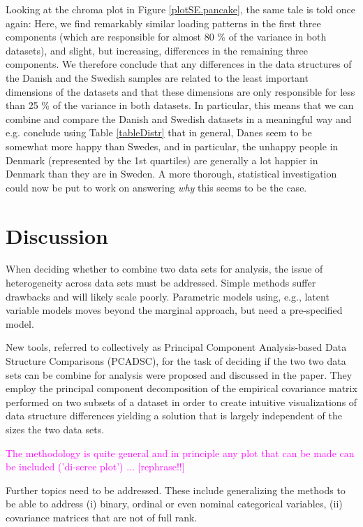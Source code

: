 \documentclass[titlepage,11pt,twoside]{article}
\newcommand{\hl}[1]{\textcolor{magenta}{#1}}
\begin{document}
Looking at the chroma plot in Figure \ref{plotSE.pancake}, the same tale is told once again: Here, we find remarkably similar loading patterns in the first three components (which are responsible for almost 80 \% of the variance in both datasets), and slight, but increasing, differences in the remaining three components. We therefore conclude that any differences in the data structures of the Danish and the Swedish samples are related to the least important dimensions of the datasets and that these dimensions are only responsible for less than 25 \% of the variance in both datasets. In particular, this means that we can combine and compare the Danish and Swedish datasets in a meaningful way and e.g. conclude using Table \ref{tableDistr} that in general, Danes seem to be somewhat more happy than Swedes, and in particular, the unhappy people in Denmark (represented by the 1st quartiles) are generally a lot happier in Denmark than they are in Sweden. A more thorough, statistical investigation could now be put to work on answering \textit{why} this seems to be the case.

\section{Discussion}
\label{sec.Discussion}
When deciding whether to combine two data sets for analysis, the issue of heterogeneity across data sets must be addressed. Simple methods suffer drawbacks and will likely scale poorly. Parametric models using, e.g., latent variable models moves beyond the marginal approach, but need a pre-specified model.

New tools, referred to collectively as Principal Component Analysis-based Data Structure Comparisons (PCADSC), for the task of deciding if the two two data sets can be combine for analysis were proposed and discussed in the paper. They employ the principal component decomposition of the empirical covariance matrix performed on two subsets of a dataset in order to create intuitive visualizations of data structure differences yielding a solution that is largely independent of the sizes  the two data sets.

\hl{
The methodology is quite general and in principle any plot that can be made can be included ('di-scree plot') ... [rephrase!!]
}

Further topics need to be addressed. These include generalizing the methods to be able to address (i) binary, ordinal or even nominal categorical variables, (ii) covariance matrices that are not of full rank.
\end{document}
